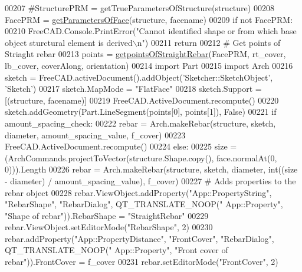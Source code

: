 \begin{DoxyCode}
00207     \textcolor{comment}{#StructurePRM = getTrueParametersOfStructure(structure)}
00208     FacePRM = \hyperlink{namespaceRebarfunc_a92122b3d7cedd3d47bb63380a5ac4d08}{getParametersOfFace}(structure, facename)
00209     \textcolor{keywordflow}{if} \textcolor{keywordflow}{not} FacePRM:
00210         FreeCAD.Console.PrintError(\textcolor{stringliteral}{"Cannot identified shape or from which base object sturctural element is
       derived\(\backslash\)n"})
00211         \textcolor{keywordflow}{return}
00212     \textcolor{comment}{# Get points of Striaght rebar}
00213     points = \hyperlink{namespaceStraightRebar_a1873c6f7f59b355a64fdd966ad75f778}{getpointsOfStraightRebar}(FacePRM, rt\_cover, lb\_cover, coverAlong, 
      orientation)
00214     \textcolor{keyword}{import} Part
00215     \textcolor{keyword}{import} Arch
00216     sketch = FreeCAD.activeDocument().addObject(\textcolor{stringliteral}{'Sketcher::SketchObject'}, \textcolor{stringliteral}{'Sketch'})
00217     sketch.MapMode = \textcolor{stringliteral}{"FlatFace"}
00218     sketch.Support = [(structure, facename)]
00219     FreeCAD.ActiveDocument.recompute()
00220     sketch.addGeometry(Part.LineSegment(points[0], points[1]), \textcolor{keyword}{False})
00221     \textcolor{keywordflow}{if} amount\_spacing\_check:
00222         rebar = Arch.makeRebar(structure, sketch, diameter, amount\_spacing\_value, f\_cover)
00223         FreeCAD.ActiveDocument.recompute()
00224     \textcolor{keywordflow}{else}:
00225         size = (ArchCommands.projectToVector(structure.Shape.copy(), face.normalAt(0, 0))).Length
00226         rebar = Arch.makeRebar(structure, sketch, diameter, int((size - diameter) / amount\_spacing\_value), 
      f\_cover)
00227     \textcolor{comment}{# Adds properties to the rebar object}
00228     rebar.ViewObject.addProperty(\textcolor{stringliteral}{"App::PropertyString"}, \textcolor{stringliteral}{"RebarShape"}, \textcolor{stringliteral}{"RebarDialog"}, QT\_TRANSLATE\_NOOP(\textcolor{stringliteral}{"
      App::Property"}, \textcolor{stringliteral}{"Shape of rebar"})).RebarShape = \textcolor{stringliteral}{"StraightRebar"}
00229     rebar.ViewObject.setEditorMode(\textcolor{stringliteral}{"RebarShape"}, 2)
00230     rebar.addProperty(\textcolor{stringliteral}{"App::PropertyDistance"}, \textcolor{stringliteral}{"FrontCover"}, \textcolor{stringliteral}{"RebarDialog"}, QT\_TRANSLATE\_NOOP(\textcolor{stringliteral}{"
      App::Property"}, \textcolor{stringliteral}{"Front cover of rebar"})).FrontCover = f\_cover
00231     rebar.setEditorMode(\textcolor{stringliteral}{"FrontCover"}, 2)

\end{DoxyCode}
